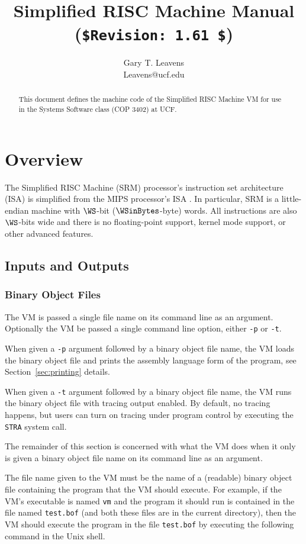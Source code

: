 \documentclass[11pt,letterpaper]{article}
\title{Simplified RISC Machine Manual \\
       (\lstinline!$Revision: 1.61 $!)}
\author{Gary T. Leavens \\
        Leavens@ucf.edu}
\newcommand{\secref}[1]{Section~\ref{#1}}  %
\begin{document}
\maketitle
\begin{abstract}
This document defines the machine code of the Simplified RISC Machine VM for
use in the Systems Software class (COP 3402) at UCF.
\end{abstract}

\section{Overview}

The Simplified RISC Machine (SRM) processor's instruction set architecture
(ISA) is simplified from the MIPS processor's ISA \cite{Kane-Heinrich92}. 
In particular, SRM is a little-endian machine with $\WS$-bit ($\WSinBytes$-byte) words.
All instructions are also $\WS$-bits wide and there is no floating-point support, kernel mode support, or other advanced features.

\subsection{Inputs and Outputs}

\subsubsection{Binary Object Files}

The VM is passed a single file name on its command line as an
argument.
Optionally the VM be passed a single command line option, either
\texttt{-p} or \texttt{-t}.

When given a \texttt{-p} argument followed by a binary object file
name, the VM loads the binary object file and prints the assembly
language form of the program, see \secref{sec:printing} details.

When given a \texttt{-t} argument followed by a binary object file
name, the VM runs the binary object file with tracing output enabled.
By default, no tracing happens, but users can turn on tracing under
program control by executing the \texttt{STRA} system call.

The remainder of this section is concerned
with what the VM does when it only is given a binary object file name
on its command line as an argument.

The file name given to the VM must be the name of a (readable)
binary object file containing the program that the VM should execute.
For example, if the VM's executable is named \texttt{vm} and the program it
should run is contained in the file named \texttt{test.bof}
(and both these files are in the current directory), then the VM should
execute the program in the file \texttt{test.bof} by executing
the following command in the Unix shell.
\end{document}
